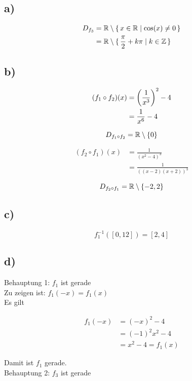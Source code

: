 \documentclass[a4paper, 11pt]{article}
\begin{document}
\subsection{a)}
\label{sec:orgf29f16b}
\begin{align*}
    D_{f_3} &= \mathbb{R} \setminus \set{x \in \mathbb{R}| \cos(x) \neq 0} \\
    &= \mathbb{R} \setminus \set{\frac{\pi}{2} + k\pi | k \in \mathbb{Z}}
\end{align*}

\subsection{b)}
\label{sec:org0d819c1}
\begin{align*}
    (f_1 \circ f_2)(x) &= \left(\frac{1}{x^3}\right)^2 - 4 \\
    &= \frac{1}{x^6} - 4
\end{align*}

$$ D_{f_1 \circ f_2} = \mathbb{R} \setminus \{0\} $$

\begin{align*}
    (f_2 \circ f_1)(x) &= \frac{1}{(x^2 - 4)^3} \\
    &= \frac{1}{((x - 2)(x + 2))^3}
\end{align*}

$$ D_{f_2 \circ f_1} = \mathbb{R} \setminus \{-2, 2\} $$

\subsection{c)}
\label{sec:org433063b}
$$ f_{1}^{-1}([0, 12]) = [2, 4] $$

\subsection{d)}
\label{sec:org99afbb5}
Behauptung 1: \(f_1\) ist gerade \\

Zu zeigen ist: \(f_1(-x) = f_1(x)\) \\
Es gilt

\begin{align*}
    f_1(-x) &= (-x)^2 - 4 \\
    &= (-1)^2 x^2 - 4 \\
    &= x^2 - 4 = f_1(x)
\end{align*}

Damit ist \(f_1\) gerade. \\


Behauptung 2: \(f_3\) ist gerade \\
\end{document}

